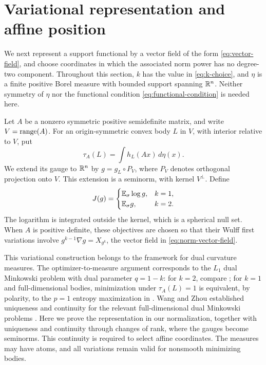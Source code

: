 \section{Variational representation and affine position}\label{sec:position}

We next represent a support functional by a vector field of the form
\eqref{eq:vector-field}, and choose coordinates in which the associated
norm power has no degree-two component. Throughout this section, $k$ has the value in
\eqref{eq:k-choice}, and $\eta$ is a finite positive Borel measure with
bounded support spanning $\mathbb R^n$. Neither symmetry of $\eta$ nor the
functional condition \eqref{eq:functional-condition} is needed here.

Let $A$ be a nonzero symmetric positive semidefinite matrix, and write
$V=\operatorname{range}(A)$. For an origin-symmetric convex body $L$ in $V$, with
interior relative to $V$, put
\[
 \tau_A(L)=\int h_L(Ax)\,d\eta(x).
\]
We extend its gauge to $\mathbb R^n$ by $g=g_L\circ P_V$, where $P_V$ denotes
orthogonal projection onto $V$. This extension is a seminorm, with
kernel $V^\perp$. Define
\begin{equation}\label{eq:variational-objective}
 J(g)=
 \begin{cases}
  \mathbb E_{\sigma}\log g,&k=1,\\
  \mathbb E_{\sigma} g,&k=2.
 \end{cases}
\end{equation}
The logarithm is integrated outside the kernel, which is a spherical
null set.
When $A$ is positive definite, these objectives are chosen so that their
Wulff first variations involve $g^{k-1}\nabla g=X_{g^k}$, the vector
field in \eqref{eq:norm-vector-field}.

This variational construction belongs to the framework for dual
curvature measures. The optimizer-to-measure argument corresponds to
the $L_1$ dual Minkowski problem with dual parameter $q=1-k$:
for $k=2$, compare \cite[Section~3.1, Lemmas~3.1--3.3]{HuangZhao2018};
for $k=1$ and full-dimensional bodies, minimization under $\tau_A(L)=1$
is equivalent, by polarity, to the $p=1$ entropy maximization in
\cite[Section~5, Lemmas~5.1--5.3]{HuangLutwakYangZhang2018}.
Wang and Zhou established uniqueness and continuity for the relevant
full-dimensional dual Minkowski problems
\cite[arXiv version, Theorems~1.1--1.3]{WangZhou2026}.
Here we prove the representation in our normalization, together with
uniqueness and continuity through changes of rank, where the gauges
become seminorms. This continuity is required to select affine
coordinates. The measures may have atoms, and all
variations remain valid for nonsmooth minimizing bodies.

